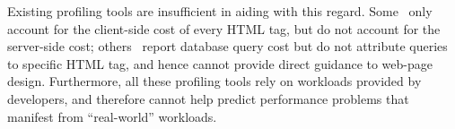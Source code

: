 Existing profiling tools are insufficient in aiding with this regard.
Some~\cite{chromeDev} only account for the client-side
cost of every HTML tag, but do not account for the server-side cost;
others~\cite{arqt} report database query cost but do not attribute
queries to specific HTML tag, and hence cannot provide direct guidance to
web-page design. Furthermore, all these profiling tools rely on 
workloads provided by developers, and therefore cannot help predict
performance problems that manifest from ``real-world'' workloads.






